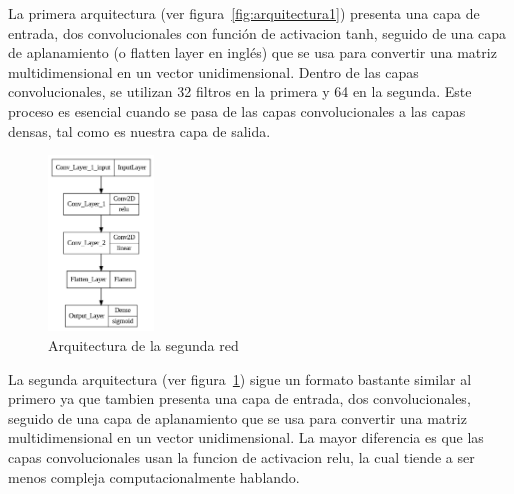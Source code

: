 \documentclass[conference, spanish, english]{IEEEtran}
\begin{document}
La primera arquitectura (ver figura~\ref{fig:arquitectura1}) presenta una capa de entrada, dos convolucionales con función de activacion tanh, seguido de una capa de aplanamiento (o flatten layer en inglés) que se usa para convertir una matriz multidimensional en un vector unidimensional. Dentro de las capas convolucionales, se utilizan 32 filtros en la primera y 64 en la segunda. Este proceso es esencial cuando se pasa de las capas convolucionales a las capas densas, tal como es nuestra capa de salida. 


\begin{figure}[H]
\centering
\includegraphics[width=0.25\textwidth]{architecture/architecture_3.png}
\caption{Arquitectura de la segunda red}
\label{fig:arquitectura2}
\end{figure}

La segunda arquitectura (ver figura~\ref{fig:arquitectura2}) sigue un formato bastante similar al primero ya que tambien presenta una capa de entrada, dos convolucionales, seguido de una capa de aplanamiento que se usa para convertir una matriz multidimensional en un vector unidimensional. La mayor diferencia es que las capas convolucionales usan la funcion de activacion relu, la cual tiende a ser menos compleja computacionalmente hablando. 



\end{document}
